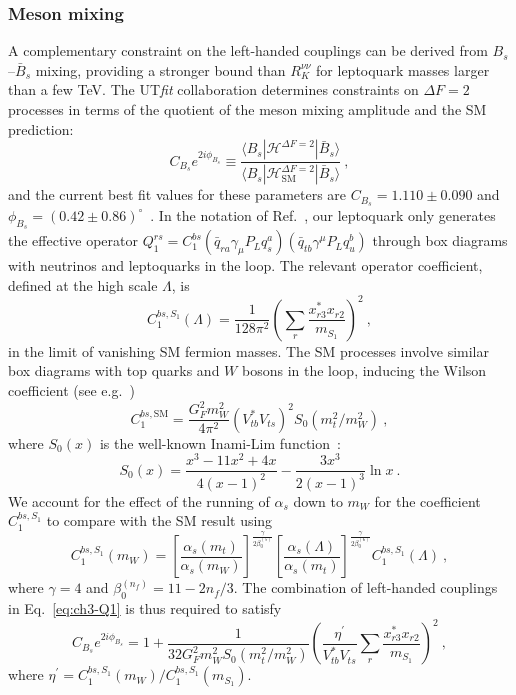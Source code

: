 \subsubsection{Meson mixing}

A complementary constraint on the left-handed couplings can be derived from
$B_s$--$\bar{B}_s$ mixing, providing a stronger bound than $R_K^{\nu\nu}$ for
leptoquark masses larger than a few TeV. The UT\textit{fit} collaboration
determines constraints on $\Delta F = 2$ processes in terms of the quotient of
the meson mixing amplitude and the SM prediction:
\begin{equation}
  C_{B_s} e^{2i \phi_{B_s}} \equiv \frac{\langle B_s | \mathscr{H}^{\Delta F = 2} | \bar{B}_s \rangle}{\langle B_s | \mathscr{H}^{\Delta F = 2}_{\text{SM}} | \bar{B}_s \rangle} \ ,
\end{equation}
and the current best fit values for these parameters are
$C_{B_s} = 1.110 \pm 0.090$ and
$\phi_{B_s} = (0.42 \pm 0.86)^\circ$~\cite{Bona:2007vi}. In the notation of
Ref.~\cite{Bona:2007vi}, our leptoquark only generates the effective operator
$Q^{rs}_1 = C^{bs}_1(\bar{q}_{ra} \gamma_\mu P_L q_s^a)(\bar{q}_{tb} \gamma^\mu P_L q_u^b)$
through box diagrams with neutrinos and leptoquarks in the loop. The relevant
operator coefficient, defined at the high scale $\Lambda$, is
\begin{equation} \label{eq:ch3-Q1}
  C^{bs, S_{1}}_{1}(\Lambda) = \frac{1}{128 \pi^2} \left(\sum_r \frac{x_{r 3}^* x_{r 2}}{m_{S_{1}}}\right)^2 \ ,
\end{equation}
in the limit of vanishing SM fermion masses. The SM processes involve similar
box diagrams with top quarks and $W$ bosons in the loop, inducing the Wilson
coefficient (see e.g.~\cite{Fleischer:2008uj})
\begin{equation}
  C^{bs, \text{SM}}_{1} = \frac{G_F^2 m_W^2}{4\pi^2}(V_{tb}^*V_{ts})^2 S_0(m_t^2 / m_W^2) \ ,
\end{equation}
where $S_0(x)$ is the well-known Inami-Lim function~\cite{Inami:1980fz}:
\begin{equation}
  S_0(x) = \frac{x^3 -11x^2 + 4x}{4(x-1)^2} - \frac{3x^3}{2(x-1)^3} \ln x \ .
\end{equation}
We account for the effect of the running of $\alpha_s$ down to $m_W$ for the
coefficient $C^{bs, S_{1}}_{1}$ to compare with the SM result
using~\cite{Aebischer:2017gaw}
\begin{equation}
  C_1^{bs, S_{1}}(m_W) =  \left[\frac{\alpha_s(m_t)}{\alpha_s(m_W)}\right]^{\frac{\gamma}{2\beta_0^{(5)}}} \left[\frac{\alpha_s(\Lambda)}{\alpha_s(m_t)}\right]^{\frac{\gamma}{2\beta_0^{(6)}}} C_1^{bs, S_{1}}(\Lambda) \ ,
\end{equation}
where $\gamma = 4$ and $\beta_0^{(n_f)} = 11 - 2 n _f / 3$. The combination of
left-handed couplings in Eq.~\eqref{eq:ch3-Q1} is thus required to satisfy
\begin{equation} \label{eq:ch3-BsBsbar}
  C_{B_s} e^{2i \phi_{B_s}} = 1 + \frac{1}{32 G_F^2 m_W^2 S_0(m_t^2/m_W^2)} \left(  \frac{\eta^\prime}{V_{tb}^* V_{ts}} \sum_r \frac{x_{r 3}^* x_{r 2}}{m_{S_{1}}} \right)^2 \ ,
\end{equation}
where $\eta^\prime = C_1^{bs, S_{1}}(m_W) / C_1^{bs, S_{1}}(m_{S_{1}})$.

